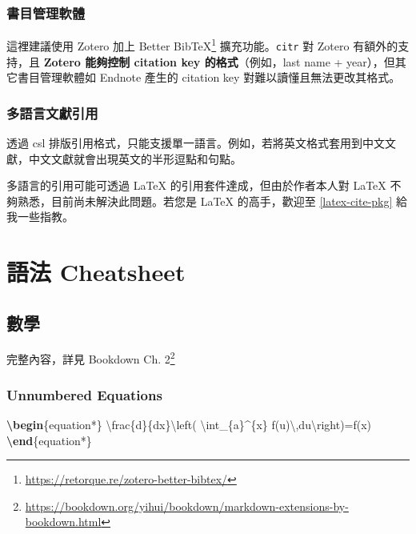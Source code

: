 \documentclass[oneside]{book}
\newenvironment{Shaded}{\begin{snugshade}}{\end{snugshade}}
\newcommand{\KeywordTok}[1]{\textcolor[rgb]{0.13,0.29,0.53}{\textbf{#1}}}
\newcommand{\SpecialCharTok}[1]{\textcolor[rgb]{0.00,0.00,0.00}{#1}}
\newcommand{\SpecialStringTok}[1]{\textcolor[rgb]{0.31,0.60,0.02}{#1}}
\newcommand{\ExtensionTok}[1]{#1}
\newcommand{\NormalTok}[1]{#1}
\renewcommand{\href}[2]{#2\footnote{\url{#1}}}
\theoremstyle{definition}
\theoremstyle{definition}
\theoremstyle{definition}
\theoremstyle{remark}
\begin{document}
\subsection{書目管理軟體}\label{ref-manager}

這裡建議使用 Zotero 加上
\href{https://retorque.re/zotero-better-bibtex/}{Better BibTeX}
擴充功能。\texttt{citr} 對 Zotero 有額外的支持，且 \textbf{Zotero
能夠控制 citation key 的格式}（例如，last name +
year），但其它書目管理軟體如 Endnote 產生的 citation key
對難以讀懂且無法更改其格式。

\subsection{多語言文獻引用}\label{multi-lang-cite}

透過 csl
排版引用格式，只能支援單一語言。例如，若將英文格式套用到中文文獻，中文文獻就會出現英文的半形逗點和句點。

多語言的引用可能可透過 LaTeX 的引用套件達成，但由於作者本人對 LaTeX
不夠熟悉，目前尚未解決此問題。若您是 LaTeX 的高手，歡迎至
\ref{latex-cite-pkg} 給我一些指教。

\chapter{語法 Cheatsheet}\label{cheatsheet}

\section{數學}\label{math}

完整內容，詳見 Bookdown
\href{https://bookdown.org/yihui/bookdown/markdown-extensions-by-bookdown.html}{Ch.
2}

\subsection{Unnumbered Equations}\label{unnumbered-equations}

\begin{Shaded}
\begin{Highlighting}[]
\KeywordTok{\textbackslash{}begin}\NormalTok{\{}\ExtensionTok{equation*}\NormalTok{\}}\SpecialStringTok{ }
\SpecialCharTok{\textbackslash{}frac}\SpecialStringTok{\{d\}\{dx\}}\SpecialCharTok{\textbackslash{}left}\SpecialStringTok{( }\SpecialCharTok{\textbackslash{}int}\SpecialStringTok{_\{a\}^\{x\} f(u)}\SpecialCharTok{\textbackslash{},}\SpecialStringTok{du}\SpecialCharTok{\textbackslash{}right}\SpecialStringTok{)=f(x)}
\KeywordTok{\textbackslash{}end}\NormalTok{\{}\ExtensionTok{equation*}\NormalTok{\} }
\end{Highlighting}
\end{Shaded}
\end{document}
